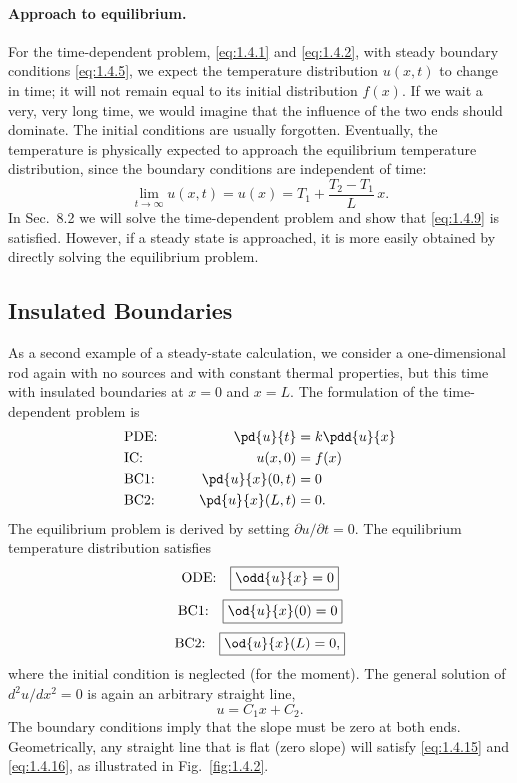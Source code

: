 \paragraph{Approach to equilibrium.}
For the time-dependent problem, \eqref{eq:1.4.1} and \eqref{eq:1.4.2}, with steady boundary conditions \eqref{eq:1.4.5}, we expect the temperature distribution $u(x,t)$ to change in time; it will not remain equal to its initial distribution $f(x)$. If we wait a very, very long time, we would imagine that the influence of the two ends should dominate. The initial conditions are usually forgotten. Eventually, the temperature is physically expected to approach the equilibrium temperature distribution, since the boundary conditions are independent of time:
\begin{equation}
\lim_{t \to \infty} u(x,t) = u(x) = T_1 + \frac{T_2 - T_1}{L}\,x.
\label{eq:1.4.9}
\end{equation}
In Sec.~8.2 we will solve the time-dependent problem and show that \eqref{eq:1.4.9} is satisfied. However, if a steady state is approached, it is more easily obtained by directly solving the equilibrium problem.

\subsection{Insulated Boundaries}
\label{sec:1.4.2}

As a second example of a steady-state calculation, we consider a one-dimensional rod again with no sources and with constant thermal properties, but this time with insulated boundaries at $x = 0$ and $x = L$. The formulation of the time-dependent problem is
\begin{alignat}{3}
&\text{PDE:} &\qquad \pd{u}{t} &= k\pdd{u}{x} \label{eq:1.4.10}\\
&\text{IC:}  &\qquad u(x,0) &= f(x) \label{eq:1.4.11}\\
&\text{BC1:} &\qquad \pd{u}{x}(0,t) &= 0 \label{eq:1.4.12}\\
&\text{BC2:} &\qquad \pd{u}{x}(L,t) &= 0. \label{eq:1.4.13}
\end{alignat}
The equilibrium problem is derived by setting $\partial u/\partial t = 0$. The equilibrium temperature distribution satisfies
\begin{equation}
\text{ODE:}\quad \boxed{\odd{u}{x} = 0}
\label{eq:1.4.14}
\end{equation}
\begin{equation}
\text{BC1:}\quad \boxed{\od{u}{x}(0) = 0}
\label{eq:1.4.15}
\end{equation}
\begin{equation}
\text{BC2:}\quad \boxed{\od{u}{x}(L) = 0,}
\label{eq:1.4.16}
\end{equation}
where the initial condition is neglected (for the moment). The general solution of $d^2u/dx^2 = 0$ is again an arbitrary straight line,
\begin{equation}
u = C_1 x + C_2.
\label{eq:1.4.17}
\end{equation}
The boundary conditions imply that the slope must be zero at both ends. Geometrically, any straight line that is flat (zero slope) will satisfy \eqref{eq:1.4.15} and \eqref{eq:1.4.16}, as illustrated in Fig.~\ref{fig:1.4.2}.

